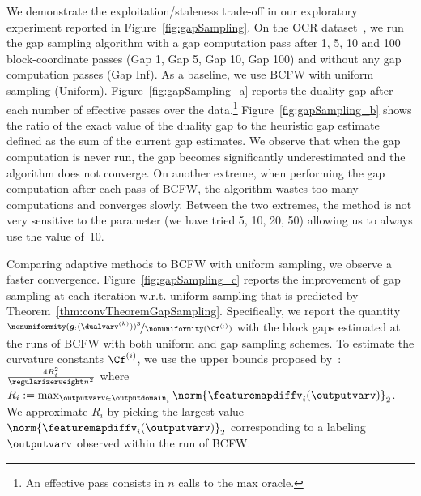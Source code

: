 \documentclass{article}
\begin{document}
We demonstrate the exploitation/staleness trade-off in our exploratory experiment reported in Figure~\ref{fig:gapSampling}.
On the OCR dataset~\citep{Taskar2003}, we run the gap sampling algorithm with a gap computation pass after 1, 5, 10 and 100 block-coordinate passes (Gap 1, Gap 5, Gap 10, Gap 100) and without any gap computation passes (Gap Inf).
As a baseline, we use BCFW with uniform sampling (Uniform). Figure~\ref{fig:gapSampling_a} reports the duality gap after each number of effective passes over the data.\footnote{An effective pass consists in $n$ calls to the max oracle.}
Figure~\ref{fig:gapSampling_b} shows the ratio of the exact value of the duality gap to the heuristic gap estimate defined as the sum of the current gap estimates.
We observe that when the gap computation is never run, the gap becomes significantly underestimated and the algorithm does not converge.
On another extreme, when performing the gap computation after each pass of BCFW, the algorithm wastes too many computations and converges slowly. Between the two extremes, the method is not very sensitive to the parameter (we have tried 5, 10, 20, 50) allowing us to always use the value of~10.

Comparing adaptive methods to BCFW with uniform sampling, we observe a faster convergence.
Figure~\ref{fig:gapSampling_c} reports the improvement of gap sampling at each iteration w.r.t. uniform sampling that is predicted by Theorem~\ref{thm:convTheoremGapSampling}. 
Specifically, we report the quantity $\nicefrac{\nonuniformity(\bm{g}_{:}(\dualvarv^{(k)}))^3}{\nonuniformity(\Cf^{(:)})}$ with the block gaps estimated at the runs of BCFW with both uniform and gap sampling schemes. To estimate the curvature constants $\Cf^{(i)}$, we use the upper bounds proposed by~\citet[App.~A]{lacosteJulien13bcfw}: $\frac{4R_i^2}{\regularizerweight n^2}$ where
$R_i:= \max_{\outputvarv \in \outputdomain_i}\norm{\featuremapdiffv_i(\outputvarv)}_2$.
We approximate $R_i$ by picking the largest value~$\norm{\featuremapdiffv_i(\outputvarv)}_2$ corresponding to a labeling~$\outputvarv$ observed within the run of BCFW.

%


%
%
%
%
\end{document}
